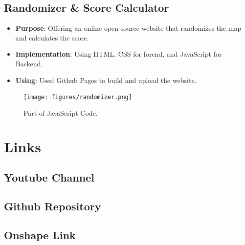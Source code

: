 \documentclass[12pt,a4paper]{article}
\begin{document}
\newpage


\subsection{Randomizer & Score Calculator}
\begin{itemize}
    \item \textbf{Purpose}: Offering an online open-source website that randomizes the map and calculates the score.
    \item \textbf{Implementation}: Using HTML, CSS for forend, and JavaScript for Backend.
    \item \textbf{Using}: Used Github Pages to build and upload the website.
\end{itemize}

\begin{figure}[ht]
    \centering
    \texttt{[image: figures/randomizer.png]}
    \caption{Part of JavaScript Code.}
    \label{fig:JS}
\end{figure}


\newpage

\section{Links}

\subsection{Youtube Channel}
\vspace{0.5cm}
\vspace{1cm}

\subsection{Github Repository}
\vspace{0.5cm}
\vspace{1cm}

\subsection{Onshape Link}
\vspace{0.5cm}

\newpage
\end{document}
